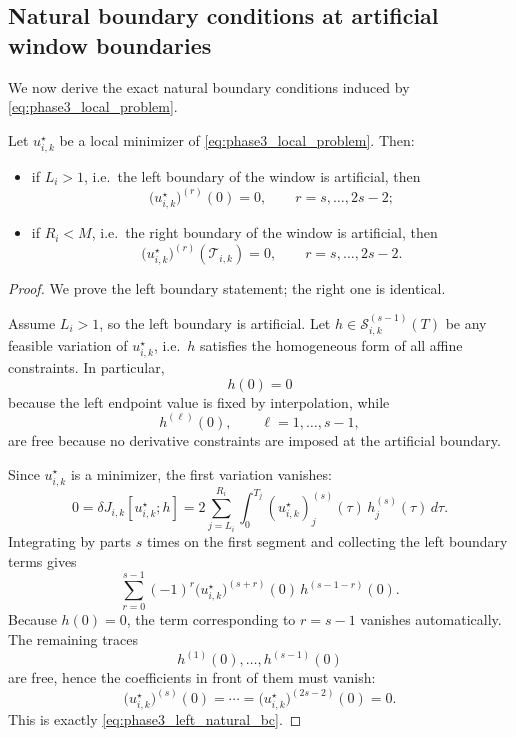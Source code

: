 \subsection{Natural boundary conditions at artificial window boundaries}
\label{subsec:phase3_natural_bc}

We now derive the exact natural boundary conditions induced by \eqref{eq:phase3_local_problem}.

\begin{proposition}
\label{prop:phase3_natural_bc}
Let \(u_{i,k}^\star\) be a local minimizer of \eqref{eq:phase3_local_problem}.
Then:
\begin{itemize}
    \item if \(L_i>1\), i.e.\ the left boundary of the window is artificial, then
    \begin{equation}
    \label{eq:phase3_left_natural_bc}
    \bigl(u_{i,k}^\star\bigr)^{(r)}(0)=0,
    \qquad r=s,\dots,2s-2;
    \end{equation}
    \item if \(R_i<M\), i.e.\ the right boundary of the window is artificial, then
    \begin{equation}
    \label{eq:phase3_right_natural_bc}
    \bigl(u_{i,k}^\star\bigr)^{(r)}(\mathcal T_{i,k})=0,
    \qquad r=s,\dots,2s-2.
    \end{equation}
\end{itemize}
\end{proposition}

\begin{proof}
We prove the left boundary statement; the right one is identical.

Assume \(L_i>1\), so the left boundary is artificial.
Let \(h\in \mathcal S_{i,k}^{(s-1)}(T)\) be any feasible variation of \(u_{i,k}^\star\), i.e.\ \(h\) satisfies the homogeneous form of all affine constraints.
In particular,
\[
h(0)=0
\]
because the left endpoint value is fixed by interpolation, while
\[
h^{(\ell)}(0),\qquad \ell=1,\dots,s-1,
\]
are free because no derivative constraints are imposed at the artificial boundary.

Since \(u_{i,k}^\star\) is a minimizer, the first variation vanishes:
\[
0
=
\delta J_{i,k}[u_{i,k}^\star;h]
=
2\sum_{j=L_i}^{R_i}\int_0^{T_j}
(u_{i,k}^\star)_j^{(s)}(\tau)\, h_j^{(s)}(\tau)\,d\tau.
\]
Integrating by parts \(s\) times on the first segment and collecting the left boundary terms gives
\[
\sum_{r=0}^{s-1}
(-1)^r
\bigl(u_{i,k}^\star\bigr)^{(s+r)}(0)\,
h^{(s-1-r)}(0).
\]
Because \(h(0)=0\), the term corresponding to \(r=s-1\) vanishes automatically.
The remaining traces
\[
h^{(1)}(0),\dots,h^{(s-1)}(0)
\]
are free, hence the coefficients in front of them must vanish:
\[
\bigl(u_{i,k}^\star\bigr)^{(s)}(0)=\cdots=
\bigl(u_{i,k}^\star\bigr)^{(2s-2)}(0)=0.
\]
This is exactly \eqref{eq:phase3_left_natural_bc}.
\end{proof}

